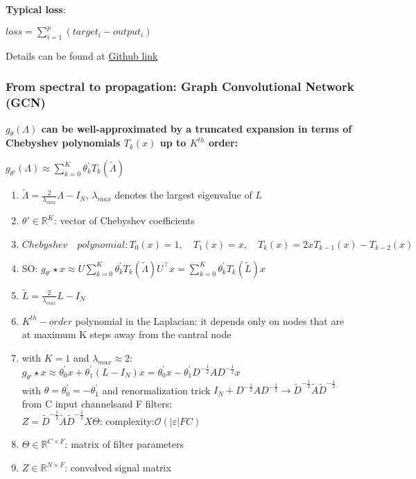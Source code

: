 \documentclass[]{article}
\begin{document}
\textbf{Typical loss}:

\(loss = \sum_{i = 1}^{p}(target_i - output_i)\)

Details can be found at
\href{https://github.com/OrdinaryCrazy/cnn-compiler-notebook/blob/master/Studying\%20Note/README.md}{Github
link}

\hypertarget{header-n1777}{%
\subsubsection{From spectral to propagation: Graph Convolutional Network
(GCN)}\label{header-n1777}}

\textbf{\(g_\theta(\Lambda)\) can be well-approximated by a truncated
expansion in terms of Chebyshev polynomials \(T_k(x)\) up to \(K^{th}\)
order:}

\(g_{\theta'}(\Lambda) \approx \sum^{K}_{k=0}\theta^{'}_{k} T_k(\widetilde{\Lambda})\)

\begin{enumerate}
\def\labelenumi{\arabic{enumi}.}
\item
  \(\widetilde{\Lambda} = \frac{2}{\lambda_{max}} \Lambda - I_N\),
  \(\lambda_{max}\) denotes the largest eigenvalue of \(L\)
\item
  \(\theta' \in \mathbb{R}^{K}\): vector of Chebyshev coefficients
\item
  \(Chebyshev \quad polynomial: T_0(x) = 1, \quad T_1(x) = x, \quad T_k(x) = 2xT_{k-1}(x) - T_{k-2}(x)\)
\item
  SO:
  \(g_{\theta '} \star x \approx U \sum^{K}_{k=0}\theta^{'}_{k} T_k(\widetilde{\Lambda})U^{\top}x = \sum^{K}_{k=0}\theta^{'}_{k} T_k(\widetilde{L})x\)
\item
  \(\widetilde{L} = \frac{2}{\lambda_{max}}L - I_N\) 
\item
  \(K^{th}-order\) polynomial in the Laplacian: it depends only on nodes
  that are at maximum K steps away from the cantral node
\item
  with \(K = 1\) and \(\lambda_{max} \approx 2\):\\
  \(g_{\theta '} \star x \approx \theta_{0}^{'}x+\theta^{'}_{1}(L-I_N)x = \theta^{'}_{0}x - \theta^{'}_{1}D^{-\frac{1}{2}}AD^{-\frac{1}{2}}x\)\\
  with \(\theta = \theta^{'}_{0} = -\theta^{'}_{1}\) and renormalization
  trick
  \(I_N + D^{-\frac{1}{2}}AD^{-\frac{1}{2}} \rightarrow \widetilde{D}^{-\frac{1}{2}} \widetilde{A} \widetilde{D}^{-\frac{1}{2}}\)\\
  from C input channelsand F filters:\\
  \(Z = \widetilde{D}^{-\frac{1}{2}} \widetilde{A} \widetilde{D}^{-\frac{1}{2}}X\Theta\):
  complexity:\(\mathcal{O}(|\varepsilon|FC)\)
\item
  \(\Theta \in \mathbb{R}^{C \times F}\): matrix of filter parameters
\item
  \(Z\in \mathbb{R}^{N \times F}\): convolved signal matrix
\end{enumerate}
\end{document}
